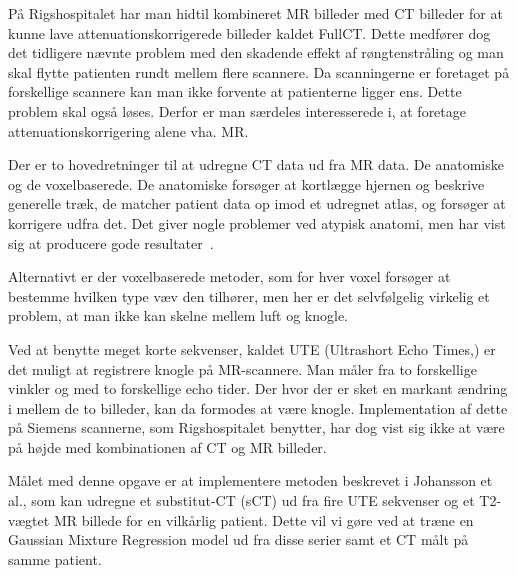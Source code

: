 På Rigshospitalet har man hidtil kombineret MR billeder med CT
billeder for at kunne lave attenuationskorrigerede billeder kaldet FullCT.
Dette medfører dog det tidligere nævnte problem med den skadende
effekt af røngtenstråling og man skal flytte patienten rundt mellem
flere scannere. Da scanningerne er foretaget på forskellige scannere
kan man ikke forvente at patienterne ligger ens. Dette problem skal
også løses. Derfor er man særdeles interesserede i, at foretage
attenuationskorrigering alene vha. MR.

Der er to hovedretninger til at udregne CT data ud fra MR data. De
anatomiske og de voxelbaserede. De anatomiske forsøger at kortlægge
hjernen og beskrive generelle træk, de matcher patient data op imod et
udregnet atlas, og forsøger at korrigere udfra det. Det giver nogle
problemer ved atypisk anatomi, men har vist sig at producere gode
resultater~\cite{atlas1, atlas2}.

Alternativt er der voxelbaserede metoder, som for hver voxel forsøger
at bestemme hvilken type væv den tilhører, men her er det selvfølgelig
virkelig et problem, at man ikke kan skelne mellem luft og knogle.

Ved at benytte meget korte sekvenser, kaldet UTE (Ultrashort Echo Times,)
er det muligt at registrere knogle på MR-scannere. Man måler fra to
forskellige vinkler og med to forskellige echo tider. Der hvor der er
sket en markant ændring i mellem de to billeder, kan da formodes at
være knogle. Implementation af dette på Siemens scannerne, som
Rigshospitalet benytter, har dog vist sig ikke at være på højde med
kombinationen af CT og MR billeder.

Målet med denne opgave er at implementere metoden beskrevet i
Johansson et al., som kan udregne et substitut-CT (sCT) ud fra fire
UTE sekvenser og et T2-vægtet MR billede for en vilkårlig patient. Dette
vil vi gøre ved at træne en Gaussian Mixture Regression model ud fra
disse serier samt et CT målt på samme patient.
